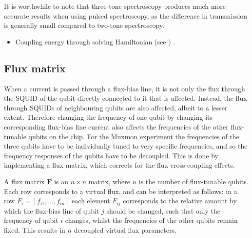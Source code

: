         It is worthwhile to note that three-tone spectroscopy produces much more accurate results when using pulsed spectroscopy, as the difference in transmission is generally small compared to two-tone spectroscopy.


        \begin{itemize}
           \item Coupling energy through solving Hamiltonian (see \cite{Reed}) .
        \end{itemize}

      \subsection{Flux matrix}
        \label{ssec:Flux matrix}
        When a current is passed through a flux-bias line, it is not only the flux through the SQUID of the qubit directly connected to it that is affected. Instead, the flux through SQUIDs of neighbouring qubits are also affected, albeit to a lesser extent. Therefore changing the frequency of one qubit by changing its corresponding flux-bias line current also affects the frequencies of the other flux-tunable qubits on the chip. For the Muxmon experiment the frequencies of the three qubits have to be individually tuned to very specific frequencies, and so the frequency responses of the qubits have to be decoupled. This is done by implementing a flux matrix, which corrects for the flux cross-coupling effects.

        A flux matrix $\boldsymbol{F}$ is an $n \times n$ matrix, where $n$ is the number of flux-tunable qubits. Each row corresponds to a virtual flux, and can be interpreted as follows: in a row $F_i = \left[f_{i1}, \dots, f_{in}\right]$ each element $F_{ij}$ corresponds to the relative amount by which the flux-bias line of qubit $j$ should be changed, such that only the frequency of qubit $i$ changes, whilst the frequencies of the other qubits remain fixed. This results in $n$ decoupled virtual flux parameters.


